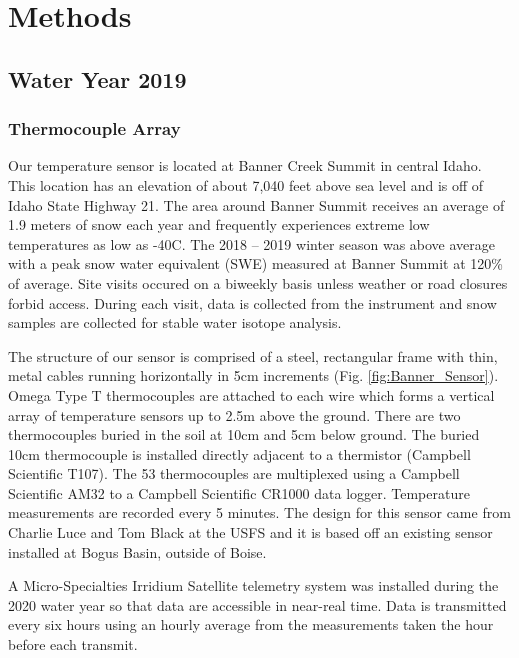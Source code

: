 \chapter{Methods}
\section{Water Year 2019} 
\subsection{Thermocouple Array}
Our temperature sensor is located at Banner Creek Summit in central Idaho. This location has an elevation of about 7,040 feet above sea level and is off of Idaho State Highway 21. The area around Banner Summit receives an average of 1.9 meters of snow each year and frequently experiences extreme low temperatures as low as -40\textdegree C. The 2018 -- 2019 winter season was above average with a peak snow water equivalent (SWE) measured at Banner Summit at 120\% of average. Site visits occured on a biweekly basis unless weather or road closures forbid access. During each visit, data is collected from the instrument and snow samples are collected for stable water isotope analysis.

The structure of our sensor is comprised of a steel, rectangular frame with thin, metal cables running horizontally in 5cm increments (Fig. \ref{fig:Banner_Sensor}). Omega Type T thermocouples are attached to each wire which forms a vertical array of temperature sensors up to 2.5m above the ground. There are two thermocouples buried in the soil at 10cm and 5cm below ground. The buried 10cm thermocouple is installed directly adjacent to a thermistor (Campbell Scientific T107). The 53 thermocouples are multiplexed using a Campbell Scientific AM32 to a Campbell Scientific CR1000 data logger. Temperature measurements are recorded every 5 minutes. The design for this sensor came from Charlie Luce and Tom Black at the USFS and it is based off an existing sensor installed at Bogus Basin, outside of Boise. 

A Micro-Specialties Irridium Satellite telemetry system was installed during the 2020 water year so that data are accessible in near-real time. Data is transmitted every six hours using an hourly average from the measurements taken the hour before each transmit.


